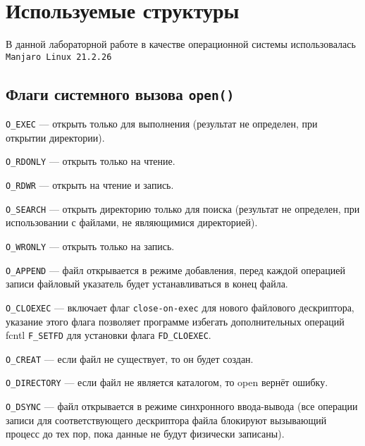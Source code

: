 \chapter{Используемые структуры}

В данной лабораторной работе в качестве операционной системы использовалась \texttt{Manjaro Linux 21.2.26}




\section*{Флаги системного вызова \texttt{open()}}

\texttt{O\_EXEC} --- открыть только для выполнения (результат не определен, при открытии директории).

\texttt{O\_RDONLY} --- открыть только на чтение.

\texttt{O\_RDWR} --- открыть на чтение и запись.

\texttt{O\_SEARCH} --- открыть директорию только для поиска (результат не определен, при использовании с файлами, не являющимися директорией).

\texttt{O\_WRONLY} --- открыть только на запись.

\texttt{O\_APPEND} --- файл открывается в режиме добавления, перед каждой операцией записи файловый указатель будет устанавливаться в конец файла.

\texttt{O\_CLOEXEC} --- включает флаг \texttt{close-on-exec} для нового файлового дескриптора, указание этого флага позволяет программе избегать дополнительных операций fcntl \texttt{F\_SETFD} для установки флага \texttt{FD\_CLOEXEC}.

\texttt{O\_CREAT} --- если файл не существует, то он будет создан.

\texttt{O\_DIRECTORY} --- если файл не является каталогом, то open вернёт ошибку.

\texttt{O\_DSYNC} --- файл открывается в режиме синхронного ввода-вывода (все операции записи для соответствующего дескриптора файла блокируют вызывающий процесс до тех пор, пока данные не будут физически записаны).

